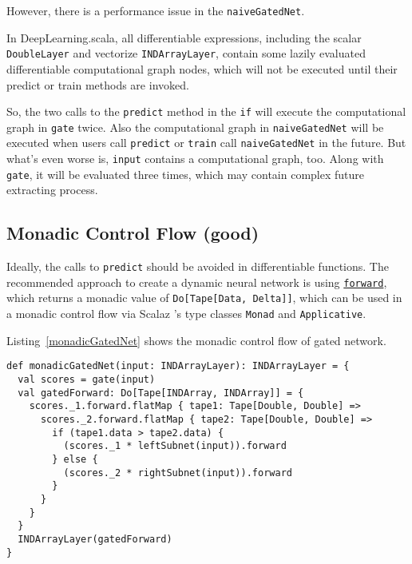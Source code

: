 However, there is a performance issue in the \lstinline{naiveGatedNet}.

In DeepLearning.scala, all differentiable expressions, including the scalar \lstinline{DoubleLayer} and vectorize \lstinline{INDArrayLayer}, contain some lazily evaluated differentiable \gls{computational graph} nodes, which will not be executed until their predict or train methods are invoked.

So, the two calls to the \lstinline{predict} method in the \lstinline{if} will execute the \gls{computational graph} in \lstinline{gate} twice. Also the \gls{computational graph} in \lstinline{naiveGatedNet} will be executed when users call \lstinline{predict} or \lstinline{train} call \lstinline{naiveGatedNet} in the future. But what's even worse is, \lstinline{input} contains a \gls{computational graph}, too. Along with \lstinline{gate}, it will be evaluated three times, which may contain complex future extracting process.

\subsection{Monadic Control Flow (good)}
\label{monadic}

Ideally, the calls to \lstinline{predict} should be avoided in differentiable functions. The recommended approach to create a dynamic neural network is using \href{https://javadoc.io/page/com.thoughtworks.deeplearning/deeplearning_2.11/latest/com/thoughtworks/deeplearning/DeepLearning.html#forward(differentiable:Differentiable):com.thoughtworks.raii.asynchronous.Do[com.thoughtworks.deeplearning.DeepLearning.Tape[DeepLearning.this.Data,DeepLearning.this.Delta]]}{\lstinline{forward}}, which returns a monadic value of \lstinline{Do[Tape[Data, Delta]]}, which can be used in a monadic control flow via Scalaz \cite{kenji2017scalaz}'s type classes \cite{oliveira2010type} \lstinline{Monad} and \lstinline{Applicative}.

Listing~\ref{monadicGatedNet} shows the monadic control flow of gated network.

\begin{lstlisting}[float={h t b p},caption={Monadic gated network}, label={monadicGatedNet}]
def monadicGatedNet(input: INDArrayLayer): INDArrayLayer = {
  val scores = gate(input)
  val gatedForward: Do[Tape[INDArray, INDArray]] = {
    scores._1.forward.flatMap { tape1: Tape[Double, Double] =>
      scores._2.forward.flatMap { tape2: Tape[Double, Double] =>
        if (tape1.data > tape2.data) {
          (scores._1 * leftSubnet(input)).forward
        } else {
          (scores._2 * rightSubnet(input)).forward
        }
      }
    }
  }
  INDArrayLayer(gatedForward)
}
\end{lstlisting}

